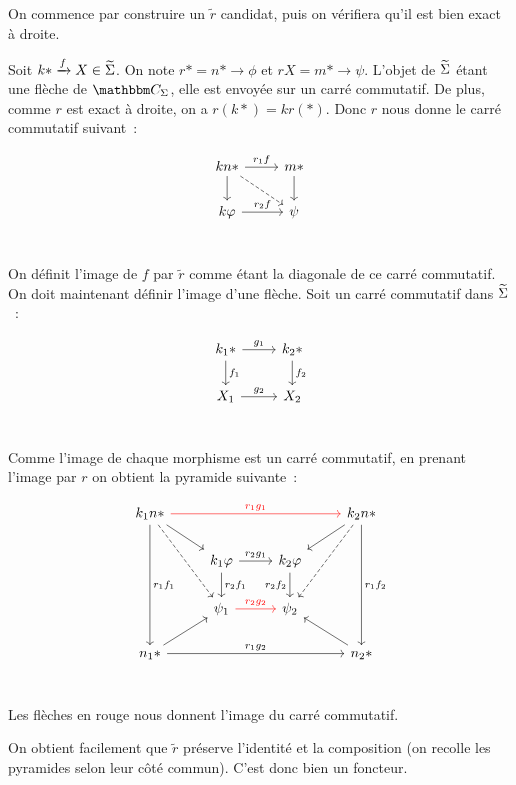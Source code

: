\begin{pv}
    On commence par construire un $\tilde{r}$ candidat, puis on
    vérifiera qu'il est bien exact à droite.
    
    Soit $k\ast\xrightarrow{f} X\in\widetilde{\Sigma}$. On note $r\ast = n\ast\rightarrow\phi$
    et $rX = m\ast\rightarrow\psi$. L'objet de $\widetilde{\Sigma}$ étant une flèche de $\C_\Sigma$,
    elle est envoyée sur un carré commutatif. De plus, comme $r$ est exact à droite,
    on a $r(k\ast) = kr(\ast)$. Donc $r$ nous donne le carré commutatif suivant~:

    \[\begin{tikzcd}
        kn\ast\arrow[r, "r_1f"]\arrow[d]\arrow[dr,dashed] & m\ast\arrow[d] \\
        k\phi\arrow[r, "r_2f"] & \psi \\
    \end{tikzcd}\]

    On définit l'image de $f$ par $\tilde{r}$ comme étant la diagonale de ce carré
    commutatif. On doit maintenant définir l'image d'une flèche. Soit un carré commutatif
    dans $\widetilde{\Sigma}$~:

    \[\begin{tikzcd}
        k_1\ast\arrow[r,"g_1"]\arrow[d,"f_1"] & k_2\ast\arrow[d,"f_2"] \\
        X_1\arrow[r,"g_2"] & X_2 \\
    \end{tikzcd}\]

    Comme l'image de chaque morphisme est un carré commutatif, en prenant
    l'image par $r$ on obtient la pyramide suivante~:

    \[\begin{tikzcd}
        k_1n\ast\arrow[rrr,red,"r_1g_1"]\arrow[dr]\arrow[ddd, "r_1f_1"]\arrow[ddr,dashed]
            & & & k_2n\ast\arrow[dl]\arrow[ddd, "r_1f_2"]\arrow[ddl,dashed] \\
        & k_1\phi\arrow[r,"r_2g_1"]\arrow[d,"r_2f_1"]
            & k_2\phi\arrow[d,swap,"r_2f_2"] & \\
        & \psi_1\arrow[r,red,"r_2g_2"]
            & \psi_2 & \\
        n_1\ast\arrow[ur]\arrow[rrr,"r_1g_2"]
            & & & n_2\ast\arrow[ul] \\
    \end{tikzcd}\]

    Les flèches en rouge nous donnent l'image du carré commutatif.

    On obtient facilement que $\tilde{r}$ préserve l'identité et la composition
    (on recolle les pyramides selon leur côté commun). C'est donc bien un foncteur.


\end{pv}
